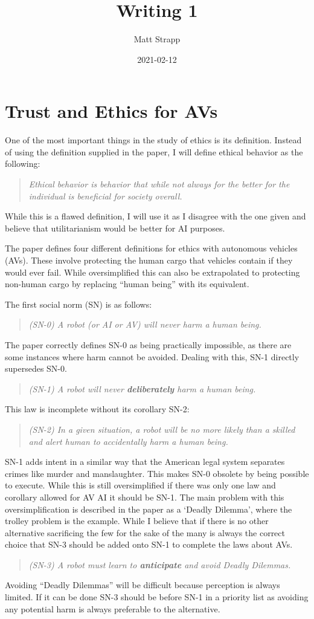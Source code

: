 \documentclass{article}
\title{Writing 1}
\author{Matt Strapp}
\date{2021-02-12}
\begin{document}
   \maketitle
   \section*{Trust and Ethics for AVs}
   One of the most important things in the study of ethics is its definition.
   Instead of using the definition supplied in the paper, I will define ethical behavior as the following:   
   \begin{quote}
      \emph{Ethical behavior is behavior that while not always for the better for the individual is beneficial for society overall.}
   \end{quote}
   While this is a flawed definition, I will use it as I disagree with the one given and believe that utilitarianism would be better for AI purposes.


   The paper defines four different definitions for ethics with autonomous vehicles (AVs).
   These involve protecting the human cargo that vehicles contain if they would ever fail.
   While oversimplified this can also be extrapolated to protecting non-human cargo by replacing ``human being'' with its equivalent.

   The first social norm (SN) is as follows:
   \begin{quote}
      \emph{(SN-0) A robot (or AI or AV) will never harm a human being.}
   \end{quote}
   The paper correctly defines SN-0 as being practically impossible, as there are some instances where harm cannot be avoided.
   Dealing with this, SN-1 directly supersedes SN-0.
   \begin{quote}
      \emph{(SN-1) A robot will never \textbf{deliberately} harm a human being.}
   \end{quote}
   This law is incomplete without its corollary SN-2:
   \begin{quote}
      \emph{(SN-2) In a given situation, a robot will be no more likely than a skilled and alert human to accidentally harm a human being.}
   \end{quote}
   SN-1 adds intent in a similar way that the American legal system separates crimes like murder and manslaughter.
   This makes SN-0 obsolete by being possible to execute.
   While this is still oversimplified if there was only one law and corollary allowed for AV AI it should be SN-1.
   The main problem with this oversimplification is described in the paper as a `Deadly Dilemma', where the trolley problem is the example.
   While I believe that if there is no other alternative sacrificing the few for the sake of the many is always the correct choice that SN-3 should be added onto SN-1 to complete the laws about AVs.
   \begin{quote}
      \emph{(SN-3) A robot must learn to \textbf{anticipate} and avoid Deadly Dilemmas.}
   \end{quote}
   Avoiding ``Deadly Dilemmas'' will be difficult because perception is always limited. 
   If it can be done SN-3 should be before SN-1 in a priority list as avoiding any potential harm is always preferable to the alternative.
   
\end{document}
